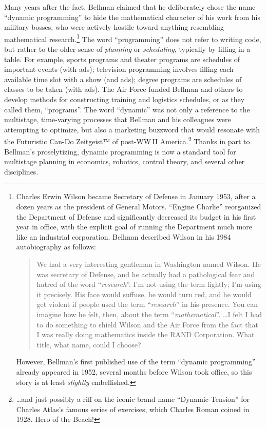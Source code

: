 Many years after the fact, Bellman claimed that he deliberately chose the name “dynamic programming” to hide the mathematical character of his work from his military bosses, who were actively hostile toward anything resembling mathematical research.\footnote{Charles Erwin Wilson became Secretary of Defense in January 1953, after a dozen years as the president of General Motors. “Engine Charlie” reorganized the Department of Defense and significantly decreased its budget in his first year in office, with the explicit goal of running the Department much more like an industrial corporation. Bellman described Wilson in his 1984 autobiography as follows:
\begin{quote}
\sffamily We had a very interesting gentleman in Washington named Wilson. He was secretary of Defense, and he actually had a pathological fear and hatred of the word “\textit{research}”. I’m not using the term lightly; I’m using it precisely. His face would suffuse, he would turn red, and he would get violent if people used the term “\textit{research}” in his presence. You can imagine how he felt, then, about the term “\textit{mathematical}”. \dots I felt I had to do something to shield Wilson and the Air Force from the fact that I was really doing mathematics inside the RAND Corporation. What title, what name, could I choose?
\end{quote}
However, Bellman’s first published use of the term “dynamic programming” already appeared in 1952, several months before Wilson took office, so this story is at least \textit{slightly} embellished.}
The word “programming” does not refer to writing code, but rather to the older sense of \textit{planning} or \textit{scheduling}, typically by filling in a table.
For example, sports programs and theater programs are schedules of important events (with ads); television programming involves filling each available time slot with a show (and ads); degree programs are schedules of classes to be taken (with ads).
The Air Force funded Bellman and others to develop methods for constructing training and logistics schedules, or as they called them, “programs”.
The word “dynamic” was not only a reference to the multistage, time-varying processes that Bellman and his colleagues were attempting to optimize, but also a marketing buzzword that would resonate with the Futuristic Can-Do Zeitgeist™ of post-WW\,II America.\footnote{\dots and just possibly a riff on the iconic brand name “Dynamic-Tension” for Charles Atlas’s famous series of exercises, which Charles Roman coined in 1928. Hero of the Beach!}
Thanks in part to Bellman’s proselytizing, dynamic programming is now a standard tool for multistage planning in economics, robotics, control theory, and several other disciplines.

